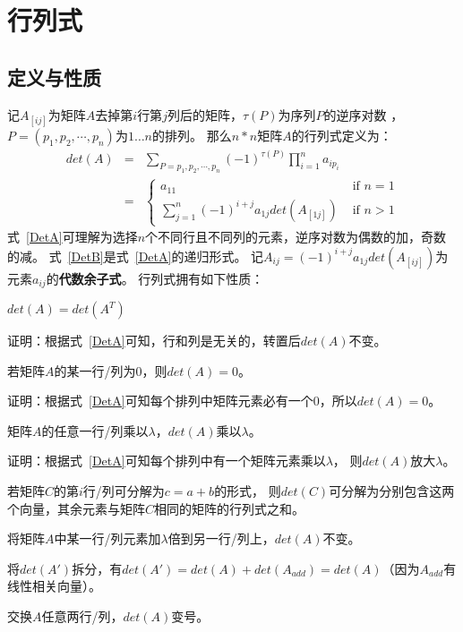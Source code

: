 \section{行列式}
\subsection{定义与性质}
记$A_{[ij]}$为矩阵$A$去掉第$i$行第$j$列后的矩阵，$\tau(P)$为序列$P$的逆序对数
，$P=(p_1,p_2,\cdots,p_n)$为$1\ldots n$的排列。
那么$n*n$矩阵$A$的行列式定义为：
\begin{eqnarray}
	det(A)&=&\sum_{P={p_1,p_2,\cdots,p_n}}
	{(-1)^{\tau(P)}\prod_{i=1}^n{a_{ip_i}}}\label{DetA}\\
	&=&\left\{
	\begin{array}{ll}
		a_{11}                                                    & \textrm{~if~$n=1$} \\
		\displaystyle \sum_{j=1}^n{(-1)^{i+j}a_{1j}det(A_{[1j]})} & \textrm{~if~$n>1$}
	\end{array}
	\right.\label{DetB}
\end{eqnarray}
式~\ref{DetA}可理解为选择$n$个不同行且不同列的元素，逆序对数为偶数的加，奇数的减。
式~\ref{DetB}是式~\ref{DetA}的递归形式。
记$A_{ij}=(-1)^{i+j}a_{1j}det(A_{[ij]})$为元素$a_{ij}$的{\bfseries 代数余子式}。
行列式拥有如下性质：
\begin{property}
	$det(A)=det(A^T)$
\end{property}
证明：根据式~\ref{DetA}可知，行和列是无关的，转置后$det(A)$不变。
\begin{property}
	若矩阵$A$的某一行/列为0，则$det(A)=0$。
\end{property}
证明：根据式~\ref{DetA}可知每个排列中矩阵元素必有一个0，所以$det(A)=0$。
\begin{property}
	矩阵$A$的任意一行/列乘以$\lambda$，$det(A)$乘以$\lambda$。
\end{property}
证明：根据式~\ref{DetA}可知每个排列中有一个矩阵元素乘以$\lambda$，
则$det(A)$放大$\lambda$。
\begin{property}
    若矩阵$C$的第$i$行/列可分解为$c=a+b$的形式，
    则$det(C)$可分解为分别包含这两个向量，其余元素与矩阵$C$相同的矩阵的行列式之和。
\end{property}
\begin{inference}
	将矩阵$A$中某一行/列元素加$\lambda$倍到另一行/列上，$det(A)$不变。
\end{inference}
将$det(A')$拆分，有$det(A')=det(A)+det(A_{add})=det(A)$（因为$A_{add}$有线性相关向量）。
\begin{property}
	交换$A$任意两行/列，$det(A)$变号。
\end{property}
